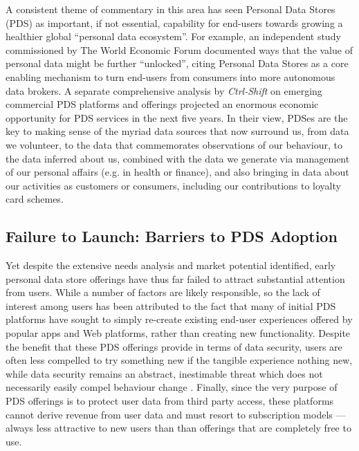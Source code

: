 \documentclass{acm_proc_article-sp}
\begin{document}
A consistent theme of commentary in this area has seen Personal Data Stores (PDS) as important, if not essential, capability for end-users towards growing a healthier global ``personal data ecosystem''. For example, an independent study commissioned by The World Economic Forum documented ways that the value of personal data might be further ``unlocked'', citing Personal Data Stores as a core enabling mechanism to turn end-users from consumers into more autonomous data brokers\cite{WEF-report}. A separate comprehensive analysis by \emph{Ctrl-Shift} on emerging commercial PDS platforms and offerings projected an enormous economic opportunity for PDS services in the next five years\cite{ctrlshift}. In their view, PDSes are the key to making sense of the myriad data sources that now surround us, from data we volunteer, to the data that commemorates observations of our behaviour, to the data inferred about us, combined with the data we generate via management of our personal affairs (e.g. in health or finance), and also bringing in data about our activities as customers or consumers, including our contributions to loyalty card schemes.

\subsection{Failure to Launch: Barriers to PDS Adoption}

Yet despite the extensive needs analysis and market potential identified, early personal data store offerings have thus far failed to attract substantial attention from users. While a number of factors are likely responsible, so the lack of interest among users has been attributed to the fact that many of initial PDS platforms have sought to simply re-create existing end-user experiences offered by popular apps and Web platforms, rather than creating new functionality. Despite the benefit that these PDS offerings provide in terms of data security, users are often less compelled to try something new if the tangible experience nothing new, while data security remains an abstract, inestimable threat which does not necessarily easily compel behaviour change \cite{bandura1977self}. Finally, since the very purpose of PDS offerings is to protect user data from third party access, these platforms cannot derive revenue from user data and must resort to subscription models --- always less attractive to new users than than offerings that are completely free to use. 
\end{document}
